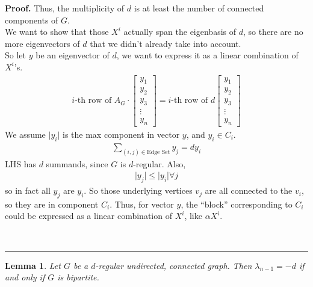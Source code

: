 \documentclass[12pt]{article}
\newtheorem{lemma}[theorem]{Lemma}
\newenvironment{proof}[1][Proof]{\textbf{#1.} }{\ \rule{0.5em}{0.5em}}
\begin{document}
\begin{proof}
    Thus, the multiplicity of $d$
    is at least the number of connected 
    components of $G$.\\
    We want to show that those $X^i$ actually
    span the eigenbasis of $d$, so there are 
    no more eigenvectors of $d$ that we 
    didn't already take into account.\\
    So let $y$ be an eigenvector of $d$,
    we want to express it as a linear combination 
    of $X^i$'s.
    \begin{align}
        i \text{-th row of } A_G \cdot
        \begin{bmatrix}
            y_1\\
            y_2\\
            y_3\\
            \vdots\\
            y_n
        \end{bmatrix} =
        i \text{-th row of }
        d \begin{bmatrix}
            y_1\\
            y_2\\
            y_3\\
            \vdots\\
            y_n
        \end{bmatrix}
    \end{align}
    We assume $\lvert y_i \rvert$
    is the max component in vector $y$, 
    and $y_i \in C_i$.
    \begin{align}
        \sum_{(i,j) \in \text{Edge Set}} y_j = d y_i
    \end{align}
    LHS has $d$ summands, since $G$ is 
    $d$-regular. Also,
    \begin{align}
        \lvert y_j \rvert \leq \lvert y_i \rvert \forall j
    \end{align}
    so in fact all $y_j$ are $y_i$.
    So those underlying vertices $v_j$ are all connected
    to the $v_i$, so they are in component $C_i$.
    Thus, for vector $y$, the ``block'' corresponding 
    to $C_i$ could be expressed as a linear combination 
    of $X^i$, like $\alpha X^i$.
    
    
\end{proof}


\begin{lemma}
Let $G$ be a $d$-regular undirected, connected graph. Then $\lambda_{n-1}=-d 
$ if and only if $G$ is bipartite.
\end{lemma}
\end{document}
